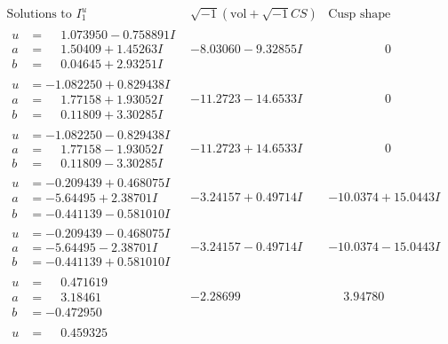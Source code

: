 \documentclass[1p]{elsarticle_modified}
\theoremstyle{definition}
\newcommand{\I}{\sqrt{-1}}
\begin{document}
$$\begin{array}{c|c|c}
\text{Solutions to }I^u_{1}& \I (\text{vol} + \sqrt{-1}CS) & \text{Cusp shape}\\
 \hline 
\begin{aligned}
u &= \phantom{-}1.073950 - 0.758891 I \\
a &= \phantom{-}1.50409 + 1.45263 I \\
b &= \phantom{-}0.04645 + 2.93251 I\end{aligned}
 & -8.03060 - 9.32855 I & \phantom{-0.000000 } 0 \\ \hline\begin{aligned}
u &= -1.082250 + 0.829438 I \\
a &= \phantom{-}1.77158 + 1.93052 I \\
b &= \phantom{-}0.11809 + 3.30285 I\end{aligned}
 & -11.2723 - 14.6533 I & \phantom{-0.000000 } 0 \\ \hline\begin{aligned}
u &= -1.082250 - 0.829438 I \\
a &= \phantom{-}1.77158 - 1.93052 I \\
b &= \phantom{-}0.11809 - 3.30285 I\end{aligned}
 & -11.2723 + 14.6533 I & \phantom{-0.000000 } 0 \\ \hline\begin{aligned}
u &= -0.209439 + 0.468075 I \\
a &= -5.64495 + 2.38701 I \\
b &= -0.441139 - 0.581010 I\end{aligned}
 & -3.24157 + 0.49714 I & -10.0374 + 15.0443 I \\ \hline\begin{aligned}
u &= -0.209439 - 0.468075 I \\
a &= -5.64495 - 2.38701 I \\
b &= -0.441139 + 0.581010 I\end{aligned}
 & -3.24157 - 0.49714 I & -10.0374 - 15.0443 I \\ \hline\begin{aligned}
u &= \phantom{-}0.471619\phantom{ +0.000000I} \\
a &= \phantom{-}3.18461\phantom{ +0.000000I} \\
b &= -0.472950\phantom{ +0.000000I}\end{aligned}
 & -2.28699\phantom{ +0.000000I} & \phantom{-}3.94780\phantom{ +0.000000I} \\ \hline\begin{aligned}
u &= \phantom{-}0.459325\phantom{ +0.000000I} \\

\end{aligned}
\end{array}$$
\end{document}
